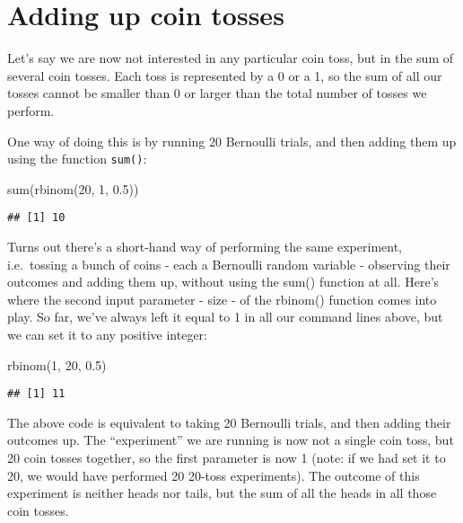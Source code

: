 \documentclass[
]{book}
\newenvironment{Shaded}{\begin{snugshade}}{\end{snugshade}}
\newcommand{\DecValTok}[1]{\textcolor[rgb]{0.00,0.00,0.81}{#1}}
\newcommand{\FloatTok}[1]{\textcolor[rgb]{0.00,0.00,0.81}{#1}}
\newcommand{\FunctionTok}[1]{\textcolor[rgb]{0.00,0.00,0.00}{#1}}
\newcommand{\NormalTok}[1]{#1}
\begin{document}
\hypertarget{adding-up-coin-tosses}{%
\section{Adding up coin tosses}\label{adding-up-coin-tosses}}

Let's say we are now not interested in any particular coin toss, but in the sum of several coin tosses. Each toss is represented by a 0 or a 1, so the sum of all our tosses cannot be smaller than 0 or larger than the total number of tosses we perform.

One way of doing this is by running 20 Bernoulli trials, and then adding them up using the function \texttt{sum()}:

\begin{Shaded}
\begin{Highlighting}[]
\FunctionTok{sum}\NormalTok{(}\FunctionTok{rbinom}\NormalTok{(}\DecValTok{20}\NormalTok{, }\DecValTok{1}\NormalTok{, }\FloatTok{0.5}\NormalTok{))}
\end{Highlighting}
\end{Shaded}

\begin{verbatim}
## [1] 10
\end{verbatim}

Turns out there's a short-hand way of performing the same experiment, i.e.~tossing a bunch of coins - each a Bernoulli random variable - observing their outcomes and adding them up, without using the sum() function at all. Here's where the second input parameter - size - of the rbinom() function comes into play. So far, we've always left it equal to 1 in all our command lines above, but we can set it to any positive integer:

\begin{Shaded}
\begin{Highlighting}[]
\FunctionTok{rbinom}\NormalTok{(}\DecValTok{1}\NormalTok{, }\DecValTok{20}\NormalTok{, }\FloatTok{0.5}\NormalTok{)}
\end{Highlighting}
\end{Shaded}

\begin{verbatim}
## [1] 11
\end{verbatim}

The above code is equivalent to taking 20 Bernoulli trials, and then adding their outcomes up. The ``experiment'' we are running is now not a single coin toss, but 20 coin tosses together, so the first parameter is now 1 (note: if we had set it to 20, we would have performed 20 20-toss experiments). The outcome of this experiment is neither heads nor tails, but the sum of all the heads in all those coin tosses.
\end{document}

